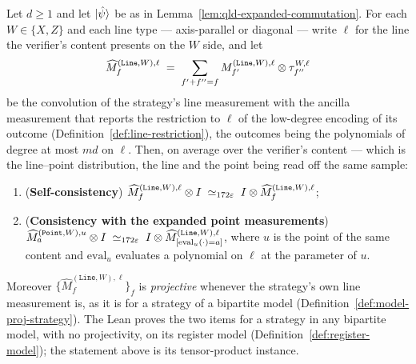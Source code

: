 \begin{lemma}
\label{lem:qld-expanded-lines}
\leanok
Let $d \geq 1$ and let $|\hat\psi\rangle$ be as in Lemma~\ref{lem:qld-expanded-commutation}. For
each $W \in \{X, Z\}$ and each line type --- axis-parallel or diagonal --- write $\ell$ for the
line the verifier's content presents on the $W$ side, and let
\begin{equation*}
  \widehat{M}^{(\mathtt{Line}, W), \ell}_f
    \;=\; \sum_{f' + f'' = f} M^{(\mathtt{Line}, W), \ell}_{f'} \otimes \tau^{W, \ell}_{f''}
\end{equation*}
be the convolution of the strategy's line measurement with the ancilla measurement that reports
the restriction to $\ell$ of the low-degree encoding of its outcome
(Definition~\ref{def:line-restriction}), the outcomes being the polynomials of degree at most
$md$ on $\ell$. Then, on average over the verifier's content --- which is the line--point
distribution, the line and the point being read off the same sample:
\begin{enumerate}
\item (\textbf{Self-consistency})
  $\widehat{M}^{(\mathtt{Line}, W), \ell}_f \otimes I \;\simeq_{172\varepsilon}\;
    I \otimes \widehat{M}^{(\mathtt{Line}, W), \ell}_f$;
\item (\textbf{Consistency with the expanded point measurements})
  $\widehat{M}^{(\mathtt{Point}, W), u}_a \otimes I \;\simeq_{172\varepsilon}\;
    I \otimes \widehat{M}^{(\mathtt{Line}, W), \ell}_{[\mathrm{eval}_u(\cdot) = a]}$,
  where $u$ is the point of the same content and $\mathrm{eval}_u$ evaluates a polynomial on
  $\ell$ at the parameter of $u$.
\end{enumerate}
Moreover $\{\widehat{M}^{(\mathtt{Line}, W), \ell}_f\}_f$ is \emph{projective} whenever the
strategy's own line measurement is, as it is for a strategy of a bipartite model
(Definition~\ref{def:model-proj-strategy}). The Lean proves the two items for a strategy in any
bipartite model, with no projectivity, on its register model (Definition~\ref{def:register-model});
the statement above is its tensor-product instance.
\end{lemma}

